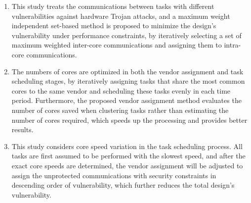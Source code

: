 \documentclass[10pt,journal, compsoc]{IEEEtran}
\begin{document}







\begin{enumerate}

\item This study treats the communications between tasks with different vulnerabilities against hardware Trojan attacks, and a maximum weight independent set-based method is proposed to minimize the design's vulnerability under performance constraints, by iteratively selecting a set of maximum weighted inter-core communications and assigning them to intra-core communications.

\item The numbers of cores are optimized in both the vendor assignment and task scheduling stages, by iteratively assigning tasks that share the most common cores to the same vendor and scheduling these tasks evenly in each time period. Furthermore, the proposed vendor assignment method evaluates the number of cores saved when clustering tasks rather than estimating the number of cores required, which speeds up the processing and provides better results.

\item This study considers core speed variation in the task scheduling process. All tasks are first assumed to be performed with the slowest speed, and after the exact core speeds are determined, the vendor assignment will be adjusted to assign the unprotected communications with security constraints in descending order of vulnerability, which further reduces the total design's vulnerability.

\end{enumerate}
\end{document}
